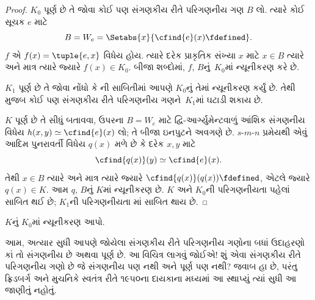 \begin{proof}
$K_0$ પૂર્ણ છે તે જોવા કોઈ પણ સંગણકીય રીતે પરિગણનીય ગણ
$B$ લો. ત્યારે કોઈ સૂચક $e$ માટે
\[
B = W_e = \Setabs{x}{\cfind{e}(x) \fdefined}.
\]
$f$ એ $f(x) = \tuple{e, x}$ વિધેય હોય. ત્યારે દરેક પ્રાકૃતિક
સંખ્યા $x$ માટે $x \in B$ ત્યારે અને માત્ર ત્યારે જ્યારે
$f(x) \in K_0$. બીજા શબ્દોમાં, $f$, $B$નું~$K_0$માં
ન્યૂનીકરણ કરે છે.

$K_1$ પૂર્ણ છે તે જોવા નોંધો કે ની
સાબિતીમાં આપણે $K_0$નું તેમાં ન્યૂનીકરણ કર્યું છે. તેથી
 મુજબ કોઈ પણ સંગણકીય રીતે
પરિગણનીય ગણને~$K_1$માં ઘટાડી શકાય છે.

$K$ પૂર્ણ છે તે સીધું બતાવવા, ઉપરના $B=W_e$ માટે
દ્વિ-આર્ગ્યુમેન્ટવાળું આંશિક સંગણનીય વિધેય
$h(x,y)\simeq\cfind{e}(x)$ લો; તે બીજા ઇનપુટને અવગણે છે.
$s$-$m$-$n$ પ્રમેયથી એવું આદિમ પુનરાવર્તી વિધેય $q(x)$
મળે છે કે દરેક $x,y$ માટે
\[
\cfind{q(x)}(y)\simeq\cfind{e}(x).
\]
તેથી $x\in B$ ત્યારે અને માત્ર ત્યારે જ્યારે
$\cfind{q(x)}(q(x))\fdefined$, એટલે જ્યારે $q(x)\in K$.
આમ $q$, $B$નું $K$માં ન્યૂનીકરણ છે. $K$ અને $K_0$ની
પરિગણનીયતા પહેલાં સાબિત થઈ છે; $K_1$ની પરિગણનીયતા
માં સાબિત થાય છે.
\end{proof}

\begin{prob}
$K$નું $K_0$માં ન્યૂનીકરણ આપો.
\end{prob}

\begin{digress}
આમ, અત્યાર સુધી આપણે જોયેલા સંગણકીય રીતે પરિગણનીય ગણોના
બધાં ઉદાહરણો કાં તો સંગણનીય છે અથવા પૂર્ણ છે. આ વિચિત્ર
લાગવું જોઈએ!{} શું એવા સંગણકીય રીતે પરિગણનીય ગણો છે જે
સંગણનીય પણ નથી અને પૂર્ણ પણ નથી? જવાબ હા છે, પરંતુ
ફ્રિડબર્ગ અને મુચનિકે સ્વતંત્ર રીતે ૧૯૫૦ના દાયકાના મધ્યમાં
આ સ્થાપ્યું ત્યાં સુધી આ જાણીતું નહોતું.
\end{digress}
\endgroup


\begingroup
\makeatletter{}\makeatother

\label{guunit:OLP-0246}


